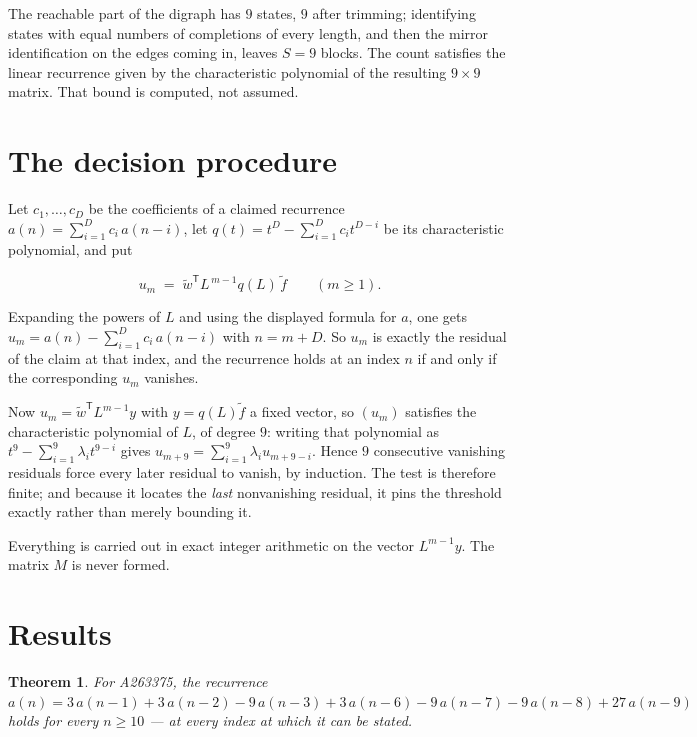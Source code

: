 \documentclass[11pt]{article}
\newtheorem{theorem}{Theorem}
\theoremstyle{definition}
\begin{document}
The reachable part of the digraph has $9$ states, $9$ after trimming; identifying states with equal numbers of completions of every length, and then the mirror identification on the edges coming in, leaves $S = 9$ blocks. The count satisfies the linear recurrence given by the characteristic polynomial of the resulting $9\times9$ matrix. That bound is computed, not assumed.

\section{The decision procedure}

Let $c_1,\dots,c_D$ be the coefficients of a claimed recurrence $a(n) = \sum_{i=1}^{D} c_i\,a(n-i)$, let $q(t) = t^{D} - \sum_{i=1}^{D} c_i t^{D-i}$ be its characteristic polynomial, and put

\[u_m \;=\; \tilde w^{\mathsf T} L^{\,m-1} q(L)\,\tilde f \qquad (m \ge 1).\]

Expanding the powers of $L$ and using the displayed formula for $a$, one gets $u_m = a(n) - \sum_{i=1}^{D} c_i\,a(n-i)$ with $n = m + D$. So $u_m$ is exactly the residual of the claim at that index, and the recurrence holds at an index $n$ if and only if the corresponding $u_m$ vanishes.

Now $u_m = \tilde w^{\mathsf T} L^{m-1} y$ with $y = q(L)\tilde f$ a fixed vector, so $(u_m)$ satisfies the characteristic polynomial of $L$, of degree $9$: writing that polynomial as $t^{9} - \sum_{i=1}^{9} \lambda_i t^{9-i}$ gives $u_{m+9} = \sum_{i=1}^{9} \lambda_i u_{m+9-i}$. Hence $9$ consecutive vanishing residuals force every later residual to vanish, by induction. The test is therefore finite; and because it locates the {\itshape last} nonvanishing residual, it pins the threshold exactly rather than merely bounding it.

Everything is carried out in exact integer arithmetic on the vector $L^{m-1}y$. The matrix $M$ is never formed.

\section{Results}

\begin{theorem} For A263375, the recurrence $a(n) = 3\,a(n-1) + 3\,a(n-2) - 9\,a(n-3) + 3\,a(n-6) - 9\,a(n-7) - 9\,a(n-8) + 27\,a(n-9)$ holds for every $n \ge 10$ --- at every index at which it can be stated.\end{theorem}
\end{document}
